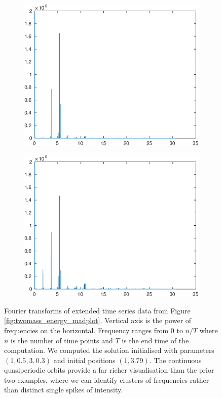 \begin{figure}[h!]
	\begin{subfigure}[b]{0.5\textwidth}
		\includegraphics[width=\textwidth]{voiced_sounds/case_3/interesting_quasi_a.eps}
	\end{subfigure}
	\begin{subfigure}[b]{0.5\textwidth}
		\includegraphics[width=\textwidth]{voiced_sounds/case_3/interesting_quasi_b.eps}
	\end{subfigure}
	\caption{
		Fourier transforms of extended time series data from Figure \ref{fig:twomass_energy_madplot}.
		Vertical axis is the power of frequencies on the horizontal.
		Frequency ranges from $0$ to $n/T$ where $n$ is the number of time points and $T$ is the end time of the computation.
		We computed the solution initialised with parameters \((1, 0.5, 3, 0.3)\) and initial positions \((1,3.79)\).
		The continuous quasiperiodic orbits provide a far richer visualisation than the prior two examples,
		where we can identify clusters of frequencies rather than distinct single spikes of intensity.
	}
	\label{fig:twomass_fourier_madplot}
\end{figure}

